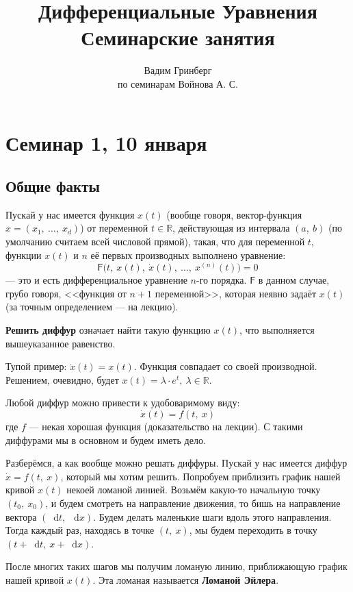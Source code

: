 \documentclass[a4paper,12pt]{article}
\title{\Huge{Дифференциальные Уравнения \\ Семинарские занятия}}
\author{Вадим Гринберг \\ по семинарам Войнова А. С.}
\date{}
\newcommand{\R}{\mathbb{R}}
\renewcommand*\d{\mathop{}\!\mathrm{d}}
\newcommand{\dx}{\dot{x}}
\newcommand{\F}{\mathsf{F}}
\begin{document}
\maketitle
\tableofcontents
\newpage

\section{Семинар 1, 10 января}

\subsection{Общие факты}
Пускай у нас имеется функция $x(t)$ (вообще говоря, вектор-функция $x = (x_1,\ \ldots,\ x_d)$) от переменной $t \in \R$, действующая из интервала $(a,\ b)$ (по умолчанию считаем всей числовой прямой), такая, что для переменной $t$, функции $x(t)$ и $n$ её первых производных выполнено уравнение:
\[\F\big(t,\ x(t),\ \dot{x}(t),\ \ldots,\ x^{(n)}(t)\big) = 0\] --- это и есть дифференциальное уравнение $n$-го порядка. $\F$ в данном случае, грубо говоря, <<функция от $n + 1$ переменной>>, которая неявно задаёт $x(t)$ (за точным определением --- на лекцию). 

\textbf{Решить диффур} означает найти такую функцию $x(t)$, что выполняется вышеуказанное равенство.

Тупой пример: $\dx(t) = x(t)$. Функция совпадает со своей производной. Решением, очевидно, будет $x(t) = \lambda \cdot e^t,\ \lambda \in \R$.

Любой диффур можно привести к удобоваримому виду: \[\dx(t) = f(t,\ x)\] где $f$ --- некая хорошая функция (доказательство на лекции). С такими диффурами мы в основном и будем иметь дело.

Разберёмся, а как вообще можно решать диффуры. Пускай у нас имеется диффур $\dx = f(t,\ x)$, который мы хотим решить. Попробуем приблизить график нашей кривой $x(t)$ некоей ломаной линией. Возьмём какую-то начальную точку $(t_0,\ x_0)$, и будем смотреть на направление движения, то бишь на направление вектора $(\d t,\ \d x)$. Будем делать маленькие шаги вдоль этого направления. Тогда каждый раз, находясь в точке $(t,\ x)$, мы будем переходить в точку $(t + \d t,\ x + \d x)$. 

После многих таких шагов мы получим ломаную линию, приближающую график нашей кривой $x(t)$. Эта ломаная называется \textbf{Ломаной Эйлера}.
\end{document}
